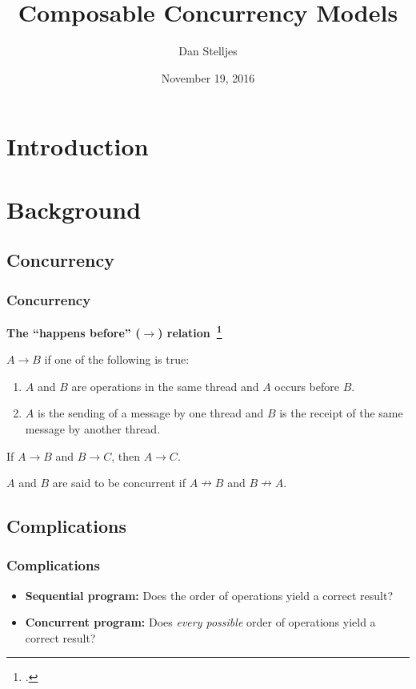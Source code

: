 \documentclass{beamer}
\title{Composable Concurrency Models}
\date{November 19, 2016}
\author{Dan Stelljes}
\begin{document}
  \maketitle

  \section{Introduction}

  \begin{frame}
    \centering
    \resizebox{\linewidth}{!}{}
  \end{frame}

  \section{Background}

  \subsection{Concurrency}

  \begin{frame}
    \frametitle{Concurrency}

    \textbf{The ``happens before'' ($\rightarrow$) relation~\footcite{Lamport1977}}

    $A \rightarrow B$ if one of the following is true:

    \begin{enumerate}
      \item $A$ and $B$ are operations in the same thread and $A$ occurs before $B$.
      \item $A$ is the sending of a message by one thread and $B$ is the receipt of the same message by another thread.
    \end{enumerate}

    If $A \rightarrow B$ and $B \rightarrow C$, then $A \rightarrow C$.

    $A$ and $B$ are said to be concurrent if $A \nrightarrow B$ and $B \nrightarrow A$.
  \end{frame}

  \subsection{Complications}

  \begin{frame}
    \frametitle{Complications}

    \begin{itemize}
      \item \textbf{Sequential program:} Does the order of operations yield a correct result?
      \vfill
      \item \textbf{Concurrent program:} Does \emph{every possible} order of operations yield a correct result?
    \end{itemize}
  \end{frame}
\end{document}
